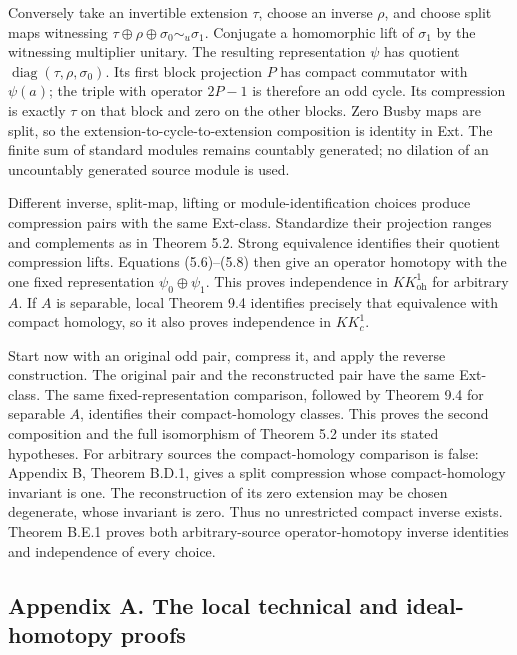 \documentclass[
  11pt,
]{article}
\begin{document}
Conversely take an invertible extension \(\tau\), choose an inverse
\(\rho\), and choose split maps witnessing
\(\tau\oplus\rho\oplus\sigma_0\sim_u\sigma_1\). Conjugate a homomorphic
lift of \(\sigma_1\) by the witnessing multiplier unitary. The resulting
representation \(\psi\) has quotient
\(\operatorname{diag}(\tau,\rho,\sigma_0)\). Its first block projection
\(P\) has compact commutator with \(\psi(a)\); the triple with operator
\(2P-1\) is therefore an odd cycle. Its compression is exactly \(\tau\)
on that block and zero on the other blocks. Zero Busby maps are split,
so the extension-to-cycle-to-extension composition is identity in Ext.
The finite sum of standard modules remains countably generated; no
dilation of an uncountably generated source module is used.

Different inverse, split-map, lifting or module-identification choices
produce compression pairs with the same Ext-class. Standardize their
projection ranges and complements as in Theorem 5.2. Strong equivalence
identifies their quotient compression lifts. Equations (5.6)--(5.8) then
give an operator homotopy with the one fixed representation
\(\psi_0\oplus\psi_1\). This proves independence in
\(KK_{\mathrm{oh}}^1\) for arbitrary \(A\). If \(A\) is separable, local
Theorem 9.4 identifies precisely that equivalence with compact homology,
so it also proves independence in \(KK_c^1\).

Start now with an original odd pair, compress it, and apply the reverse
construction. The original pair and the reconstructed pair have the same
Ext-class. The same fixed-representation comparison, followed by Theorem
9.4 for separable \(A\), identifies their compact-homology classes. This
proves the second composition and the full isomorphism of Theorem 5.2
under its stated hypotheses. For arbitrary sources the compact-homology
comparison is false: Appendix B, Theorem B.D.1, gives a split
compression whose compact-homology invariant is one. The reconstruction
of its zero extension may be chosen degenerate, whose invariant is zero.
Thus no unrestricted compact inverse exists. Theorem B.E.1 proves both
arbitrary-source operator-homotopy inverse identities and independence
of every choice.

\subsection{Appendix A. The local technical and ideal-homotopy
proofs}\label{appendix-a.-the-local-technical-and-ideal-homotopy-proofs}
\end{document}
